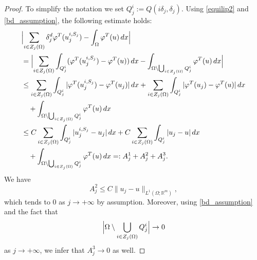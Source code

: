\documentclass{article}
\theoremstyle{plain}
\theoremstyle{definition}
\def\rr{{\mathbb R}}
\newcommand{\f}{\varphi}
\newcommand{\dej}{\delta_j}
\numberwithin{equation}{section}
\begin{document}
\begin{proof}
   To simplify the notation we set $Q^i_j:=Q(i\dej,\delta_j)$. Using \eqref{equilip2} and \eqref{bd_assumption}, the following estimate holds:
    \begin{equation*}
        \begin{split}
           & \Bigl|\sum_{i \in Z_j(\Omega)}\delta_j^d\f^T(u^{i,S_j}_j)-\int_{\Omega}\varphi^T(u)\, dx\Bigr|\\
            &=\Bigl|\sum_{i \in Z_j(\Omega)}\int_{Q^i_j}(\f^T(u^{i,S_j}_j)-\f^T(u))\, dx-\int_{\Omega\setminus\bigcup_{i \in Z_j(\Omega)}Q^i_j}\f^T(u)\, dx\Bigr|\\
            &\leq\sum_{i \in Z_j(\Omega)}\int_{Q_j^i}|\f^T(u^{i,S_j}_j)-\f^T(u_j)|\, dx + \sum_{i \in Z_j(\Omega)}\int_{Q_j^i}| \f^T(u_j)-\f^T(u)|\, dx \\
            &\quad + \int_{\Omega\setminus\bigcup_{i \in Z_j(\Omega)}Q_j^i}\varphi^T(u)\, dx \\
            &\leq C\sum_{i \in Z_j(\Omega)}\int_{Q_j^i}|u^{i,S_j}_j-u_j|\, dx + C \sum_{i \in Z_j(\Omega)}\int_{Q_j^i}|u_j-u|\, dx \\
            &\quad + \int_{\Omega\setminus\bigcup_{i \in Z_j(\Omega)}Q_j^i}\varphi^T(u)\, dx  =: A^1_j+A^2_j+A^3_j.
        \end{split}
    \end{equation*}
We have 
    \begin{equation*}
        A_j^2\leq C\|u_j-u\|_{L^1(\Omega; \rr^m)},
    \end{equation*}
    which tends to $0$ as $j \to +\infty$ by assumption. Moreover, using \eqref{bd_assumption} and the fact that 
    \begin{equation*}
        \Bigl|\Omega\setminus \bigcup_{i \in Z_j(\Omega)} Q^i_j\Bigr|\to 0
    \end{equation*}
    as $j \to +\infty$, we infer that $A^3_j\to 0$ as well. 
    

\end{proof}
\end{document}
